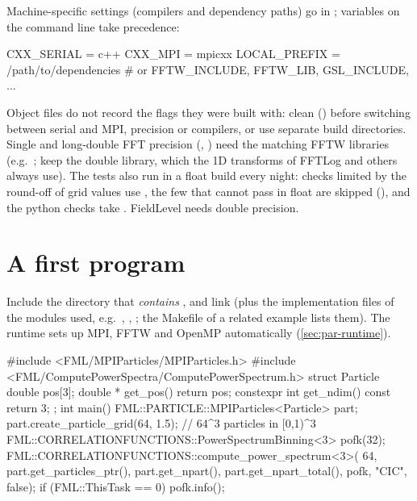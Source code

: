 Machine-specific settings (compilers and dependency paths) go in ; variables on the command line take precedence:

\begin{paramfile}
CXX_SERIAL   = c++
CXX_MPI      = mpicxx
LOCAL_PREFIX = /path/to/dependencies    # or FFTW_INCLUDE, FFTW_LIB, GSL_INCLUDE, ...
\end{paramfile}

Object files do not record the flags they were built with: clean () before switching between serial and MPI, precision
or compilers, or use separate build directories. Single and long-double FFT precision (,
) need the matching FFTW libraries (e.g.\ ; keep the
double library, which the 1D transforms of FFTLog and others always use). The tests also run in a float build every night:
checks limited by the round-off of grid values use , the few that cannot pass
in float are skipped (), and the python checks take . FieldLevel needs
double precision.

\section{A first program}\label{sec:gs-first}

Include the directory that \emph{contains} , and link  (plus the implementation files of the modules used,
e.g.\ , , ; the Makefile of a related example lists them). The runtime sets up MPI, FFTW and
OpenMP automatically (\cref{sec:par-runtime}).

\begin{cppcode}
#include <FML/MPIParticles/MPIParticles.h>
#include <FML/ComputePowerSpectra/ComputePowerSpectrum.h>
struct Particle {
    double pos[3]{};
    double * get_pos() { return pos; }
    constexpr int get_ndim() const { return 3; }
};
int main() {
    FML::PARTICLE::MPIParticles<Particle> part;
    part.create_particle_grid(64, 1.5);                      // 64^3 particles in [0,1)^3
    FML::CORRELATIONFUNCTIONS::PowerSpectrumBinning<3> pofk(32);
    FML::CORRELATIONFUNCTIONS::compute_power_spectrum<3>(
        64, part.get_particles_ptr(), part.get_npart(), part.get_npart_total(), pofk, "CIC", false);
    if (FML::ThisTask == 0) pofk.info();
}
\end{cppcode}


